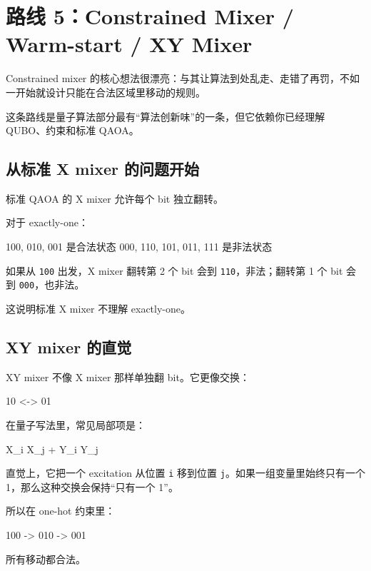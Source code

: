 \documentclass[UTF8,12pt,a4paper]{ctexart}
\begin{document}
\section*{路线 5：Constrained Mixer / Warm-start / XY Mixer}

Constrained mixer 的核心想法很漂亮：与其让算法到处乱走、走错了再罚，不如一开始就设计只能在合法区域里移动的规则。

这条路线是量子算法部分最有“算法创新味”的一条，但它依赖你已经理解 QUBO、约束和标准 QAOA。

\subsection*{从标准 X mixer 的问题开始}

标准 QAOA 的 X mixer 允许每个 bit 独立翻转。

对于 exactly-one：

\begin{GuideVerbatim}
100, 010, 001 是合法状态
000, 110, 101, 011, 111 是非法状态
\end{GuideVerbatim}

如果从 \texttt{100} 出发，X mixer 翻转第 2 个 bit 会到 \texttt{110}，非法；翻转第 1 个 bit 会到 \texttt{000}，也非法。

这说明标准 X mixer 不理解 exactly-one。

\subsection*{XY mixer 的直觉}

XY mixer 不像 X mixer 那样单独翻 bit。它更像交换：

\begin{GuideVerbatim}
10 <-> 01
\end{GuideVerbatim}

在量子写法里，常见局部项是：

\begin{GuideVerbatim}
X_i X_j + Y_i Y_j
\end{GuideVerbatim}

直觉上，它把一个 excitation 从位置 \texttt{i} 移到位置 \texttt{j}。如果一组变量里始终只有一个 1，那么这种交换会保持“只有一个 1”。

所以在 one-hot 约束里：

\begin{GuideVerbatim}
100 -> 010 -> 001
\end{GuideVerbatim}

所有移动都合法。
\end{document}
